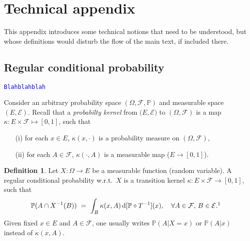 \documentclass[12pt]{article}
\renewcommand{\d}{\mathrm{d}}
\newcommand{\F}{\mathcal{F}}
\renewcommand{\P}{\mathbb{P}}
\newcommand{\set}[1]{\left\{#1\right\}}
\newcommand{\ra}{\rightarrow}
\newcommand{\pika}{\boldsymbol{\cdot}}
\newcommand{\1}{\mathbbm{1}}
\newcommand{\5}{\vspace{0.5cm}}
\theoremstyle{definition}
\newtheorem{df}[thm]{Definition}
\begin{document}
\pagebreak




\appendix

\section{Technical appendix}

This appendix introduces some technical notions that need to be understood, but whose definitions would disturb the flow of the main text, if included there.


\subsection{Regular conditional probability}\label{app:1}

\textcolor{blue}{\texttt{Blahblahblah}} %

Consider an arbitrary probability space $(\Omega,\F,\P)$ and measurable space $(E,\mathcal{E})$. Recall that a \textit{probabilty kernel} from $(E,\mathcal{E)}$ to $(\Omega,\F)$ is a map $\kappa:E\times\F\mapsto[0,1]$, such that
\begin{itemize}
	\item[(i)] for each $x\in E$, $\kappa(x,\pika)$ is a probability measure on $(\Omega,\F)$,
	\item[(ii)] for each $A\in\F$, $\kappa(\pika,A)$ is a measurable map ($E\ra[0,1]$).
\end{itemize}

\begin{df}
Let $X:\Omega\ra E$ be a measurable function (random variable). A regular conditional probability w.r.t.~$X$ is a transition kernel $\kappa:E\times\F\ra[0,1]$, such that
$$\P(A\cap X^{-1}(B)) ~=~ \int_B \kappa(x,A)\,\d[\P\circ T^{-1}](x), \quad \forall A\in\F,\,B\in\mathcal{E}.\footnote{Instead of $\P(A\cap X^{-1}(B))$, one could also write $\P(A\cap\set{X\in B)}$ or $\P(A~\text{and}~X\in B)$.}$$ 
Given fixed $x\in E$ and $A\in\F$, one usually writes $\P(A|X=x)$ or $\P(A|x)$ instead of $\kappa(x,A)$.
\end{df}
\end{document}
